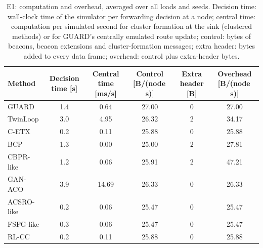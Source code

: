\begin{table}[!htb]
\caption{E1: computation and overhead, averaged over all loads and seeds. Decision time: wall-clock time of the simulator per forwarding decision at a node; central time: computation per simulated second for cluster formation at the sink (clustered methods) or for GUARD's centrally emulated route update; control: bytes of beacons, beacon extensions and cluster-formation messages; extra header: bytes added to every data frame; overhead: control plus extra-header bytes.\label{tab:complexity}}
\footnotesize
\begin{tabularx}{\textwidth}{lCCCCC}
\toprule
\textbf{Method} & \textbf{Decision time [\textmu{}s]} & \textbf{Central time [ms/s]} & \textbf{Control [B/(node\,s)]} & \textbf{Extra header [B]} & \textbf{Overhead [B/(node\,s)]}\\
\midrule
GUARD & 1.4 & 0.64 & 27.00 & 0 & 27.00 \\
TwinLoop & 3.0 & 4.95 & 26.32 & 2 & 34.17 \\
C-ETX & 0.2 & 0.11 & 25.88 & 0 & 25.88 \\
BCP & 1.3 & 0.00 & 25.00 & 2 & 27.81 \\
CBPR-like & 1.2 & 0.06 & 25.91 & 2 & 47.21 \\
GAN-ACO & 3.9 & 14.69 & 26.33 & 0 & 26.33 \\
ACSRO-like & 0.2 & 0.06 & 25.47 & 0 & 25.47 \\
FSFG-like & 0.3 & 0.06 & 25.47 & 0 & 25.47 \\
RL-CC & 0.2 & 0.11 & 25.88 & 0 & 25.88 \\
\bottomrule
\end{tabularx}
\end{table}
